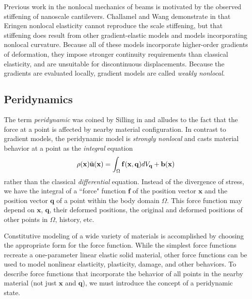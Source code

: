\documentclass[11pt]{amsart}
\newcommand{\mathbi}[1]{\mathit{\mathbf{#1}}}
\begin{document}
Previous work in the nonlocal mechanics of beams is motivated by the observed stiffening of nanoscale cantilevers.
Challamel and Wang demonstrate in \cite{Challamel2008small} that Eringen nonlocal elasticity cannot reproduce the scale stiffening, but that stiffening does result from other gradient-elastic models and models incorporating nonlocal curvature.
Because all of these models incorporate higher-order gradients of deformation, they impose stronger continuity requirements than classical elasticity, and are unsuitable for discontinuous displacements.
Because the gradients are evaluated locally, gradient models are called \textit{weakly nonlocal}.

%
\subsection{Peridynamics}
\label{sec:PDintro}
The term \textit{peridynamic} was coined by Silling in \cite{silling2000reformulation} and alludes to the fact that the force at a point is affected by nearby material configuration.
In contrast to gradient models, the peridynamic model is \textit{strongly nonlocal} and casts material behavior at a point as the \textit{integral} equation 
%
\begin{equation}
\label{eq:PDCoPV}
\rho(\mathbf{x})\ddot{\mathbf{u}}(\mathbf{x}) = \int_\Omega \mathbi{f}(\mathbf{x},\mathbf{q}) dV_\mathbf{q}  + \mathbf{b}(\mathbf{x}) \notag
\end{equation}
%
rather than the classical \textit{differential} equation.
Instead of the divergence of stress, we have the integral of a ``force" function $\mathbi{f}$ of the position vector $\mathbf{x}$ and the position vector $\mathbf{q}$ of a point within the body domain $\Omega$. 
This force function may depend on \(\mathbf{x}\), \(\mathbf{q}\), their deformed positions, the original and deformed positions of other points in \(\Omega\), history, etc.

Constitutive modeling of a wide variety of materials is accomplished by choosing the appropriate form for the force function.
While the simplest force functions recreate a one-parameter linear elastic solid material\cite{silling2000reformulation}, other force functions can be used to model nonlinear elasticity, plasticity, damage, and other behaviors\cite{silling2005peridynamic}.
To describe force functions that incorporate the behavior of all points in the nearby material (not just \(\mathbf{x}\) and \(\mathbf{q}\)), we must introduce the concept of a peridynamic state.
\end{document}
